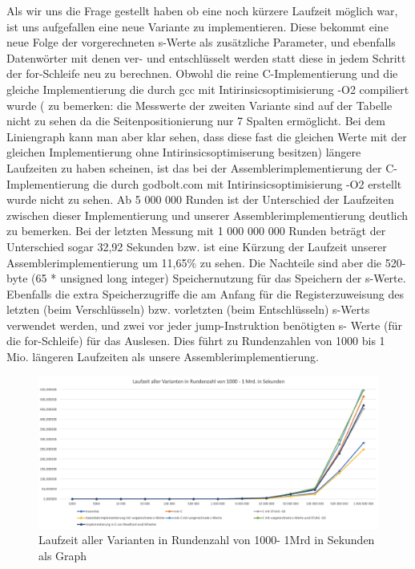 \documentclass[course=asp]{aspdoc}
\begin{document}
Als wir uns die Frage gestellt haben ob eine noch kürzere Laufzeit möglich war, ist uns aufgefallen eine neue Variante zu implementieren. Diese bekommt eine neue Folge der vorgerechneten s-Werte als zusätzliche Parameter, und ebenfalls Datenwörter mit denen ver- und entschlüsselt werden statt diese in jedem Schritt der for-Schleife neu zu berechnen. Obwohl die reine C-Implementierung und die gleiche Implementierung die durch gcc mit Intirinsicsoptimisierung -O2 compiliert wurde ( zu bemerken: die  Messwerte der zweiten Variante sind auf der Tabelle nicht zu sehen da die Seitenpositionierung nur 7 Spalten ermöglicht. Bei dem Liniengraph kann man aber klar sehen, dass diese fast die gleichen Werte mit der gleichen Implementierung ohne Intirinsicsoptimiserung besitzen) längere Laufzeiten zu haben scheinen, ist das bei der Assemblerimplementierung der C-Implementierung die durch godbolt.com mit Intirinsicsoptimisierung -O2 erstellt wurde nicht zu sehen. Ab 5 000 000 Runden ist der Unterschied der Laufzeiten zwischen dieser Implementierung und unserer Assemblerimplementierung deutlich zu bemerken. Bei der letzten Messung mit 1 000 000 000 Runden beträgt der Unterschied sogar 32,92 Sekunden bzw. ist eine Kürzung der Laufzeit unserer Assemblerimplementierung um 11,65\% zu sehen. Die Nachteile sind aber die 520-byte (65 * unsigned long integer) Speichernutzung für das Speichern der s-Werte. Ebenfalls die extra Speicherzugriffe die am Anfang für die Registerzuweisung des letzten (beim Verschlüsseln) bzw. vorletzten (beim Entschlüsseln) s-Werts verwendet werden, und zwei vor jeder jump-Instruktion benötigten s- Werte (für die for-Schleife) für das Auslesen. Dies führt zu Rundenzahlen von 1000 bis 1 Mio. längeren Laufzeiten als unsere Assemblerimplementierung.

\begin{figure}[h]
\centering
\includegraphics[scale = 0.4]{Analyse.png}
\caption{Laufzeit aller Varianten in Rundenzahl von 1000- 1Mrd in Sekunden als Graph}
\end{figure}
\newpage
\end{document}

